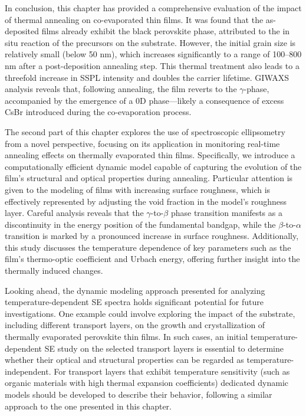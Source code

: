 In conclusion, this chapter has provided a comprehensive evaluation of the impact of thermal annealing on co-evaporated  thin films. It was found that the as-deposited films already exhibit the black perovskite phase, attributed to the in situ reaction of the precursors on the substrate. However, the initial grain size is relatively small (below 50 nm), which increases significantly to a range of 100–800 nm after a post-deposition annealing step. This thermal treatment also leads to a threefold increase in SSPL intensity and doubles the carrier lifetime. GIWAXS analysis reveals that, following annealing, the film reverts to the $\gamma$-phase, accompanied by the emergence of a 0D  phase—likely a consequence of excess CsBr introduced during the co-evaporation process.

The second part of this chapter explores the use of spectroscopic ellipsometry from a novel perspective, focusing on its application in monitoring real-time annealing effects on thermally evaporated thin films. Specifically, we introduce a computationally efficient dynamic model capable of capturing the evolution of the film’s structural and optical properties during annealing. Particular attention is given to the modeling of films with increasing surface roughness, which is effectively represented by adjusting the void fraction in the model's roughness layer. Careful analysis reveals that the $\gamma$-to-$\beta$ phase transition manifests as a discontinuity in the energy position of the fundamental bandgap, while the $\beta$-to-$\alpha$ transition is marked by a pronounced increase in surface roughness. Additionally, this study discusses the temperature dependence of key parameters such as the film’s thermo-optic coefficient and Urbach energy, offering further insight into the thermally induced changes. 

Looking ahead, the dynamic modeling approach presented for analyzing temperature-dependent SE spectra holds significant potential for future investigations. One example could involve exploring the impact of the substrate, including different transport layers, on the growth and crystallization of thermally evaporated perovskite thin films. In such cases, an initial temperature-dependent SE study on the selected transport layers is essential to determine whether their optical and structural properties can be regarded as temperature-independent. For transport layers that exhibit temperature sensitivity (such as organic materials with high thermal expansion coefficients) dedicated dynamic models should be developed to describe their behavior, following a similar approach to the one presented in this chapter.

\cleardoublepage

